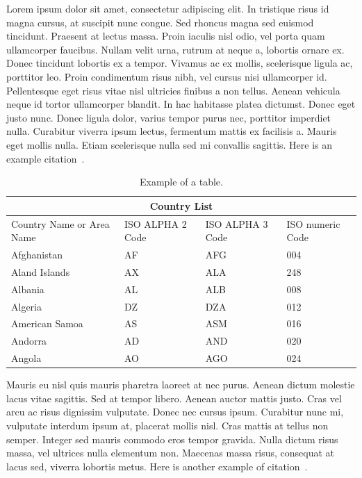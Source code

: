 \documentclass[11pt,a4paper]{article}
\begin{document}
Lorem ipsum dolor sit amet, consectetur adipiscing elit. In tristique risus id magna cursus, at suscipit nunc congue. Sed rhoncus magna sed euismod tincidunt. Praesent at lectus massa. Proin iaculis nisl odio, vel porta quam ullamcorper faucibus. Nullam velit urna, rutrum at neque a, lobortis ornare ex. Donec tincidunt lobortis ex a tempor. Vivamus ac ex mollis, scelerisque ligula ac, porttitor leo. Proin condimentum risus nibh, vel cursus nisi ullamcorper id. Pellentesque eget risus vitae nisl ultricies finibus a non tellus. Aenean vehicula neque id tortor ullamcorper blandit. In hac habitasse platea dictumst. Donec eget justo nunc. Donec ligula dolor, varius tempor purus nec, porttitor imperdiet nulla. Curabitur viverra ipsum lectus, fermentum mattis ex facilisis a. Mauris eget mollis nulla. Etiam scelerisque nulla sed mi convallis sagittis. Here is an example citation~\cite{brin1998anatomy}.

\begin{table}[h!]
\centering
	\caption{Example of a table.\label{tab:1}}
   \renewcommand{\arraystretch}{1.1}
   \setlength{\tabcolsep}{2.5pt}
\begin{tabular}{ |p{3cm}||p{3cm}|p{3cm}|p{3cm}|  }
 \hline
 \multicolumn{4}{|c|}{Country List} \\
 \hline
 Country Name or Area Name& ISO ALPHA 2 Code &ISO ALPHA 3 Code&ISO numeric Code\\
 \hline
 Afghanistan   & AF    &AFG&   004\\
 Aland Islands&   AX  & ALA   &248\\
 Albania &AL & ALB&  008\\
 Algeria    &DZ & DZA&  012\\
 American Samoa&   AS  & ASM&016\\
 Andorra& AD  & AND   &020\\
 Angola& AO  & AGO&024\\
 \hline
\end{tabular}
\end{table}


Mauris eu nisl quis mauris pharetra laoreet at nec purus. Aenean dictum molestie lacus vitae sagittis. Sed at tempor libero. Aenean auctor mattis justo. Cras vel arcu ac risus dignissim vulputate. Donec nec cursus ipsum. Curabitur nunc mi, vulputate interdum ipsum at, placerat mollis nisl. Cras mattis at tellus non semper. Integer sed mauris commodo eros tempor gravida. Nulla dictum risus massa, vel ultrices nulla elementum non. Maecenas massa risus, consequat at lacus sed, viverra lobortis metus. Here is another example of citation~\cite{brin1998anatomy_2}.
\end{document}
